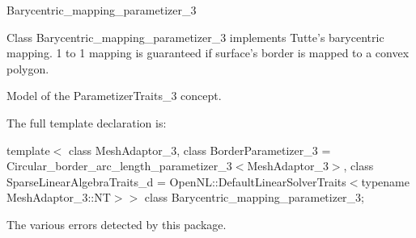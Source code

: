 

\begin{ccRefClass}{Barycentric_mapping_parametizer_3}  %


\ccDefinition


Class Barycentric\_mapping\_parametizer\_3 implements Tutte's barycentric mapping. 1 to 1 mapping is guaranteed if surface's border is mapped to a convex polygon.



\ccIsModel

Model of the ParametizerTraits\_3 concept.



\ccParameters

The full template declaration is:

template$<$
class MeshAdaptor\_3, 
class BorderParametizer\_3 = Circular\_border\_arc\_length\_parametizer\_3$<$MeshAdaptor\_3$>$, 
class SparseLinearAlgebraTraits\_d = OpenNL::DefaultLinearSolverTraits$<$typename MeshAdaptor\_3::NT$>$$>$ 
class Barycentric\_mapping\_parametizer\_3;


\ccTypes


{
}
{
The various errors detected by this package.
}
{
}
{
}
{
}
{
}
{
}
{
}
{
}
{
}
{
}
{
}
{
}
{
}
{
}
{
}
{
}
{
}
{
}
{
}
{
}
{
}
{
}
{
}
{
}
{
}



\end{ccRefClass}
